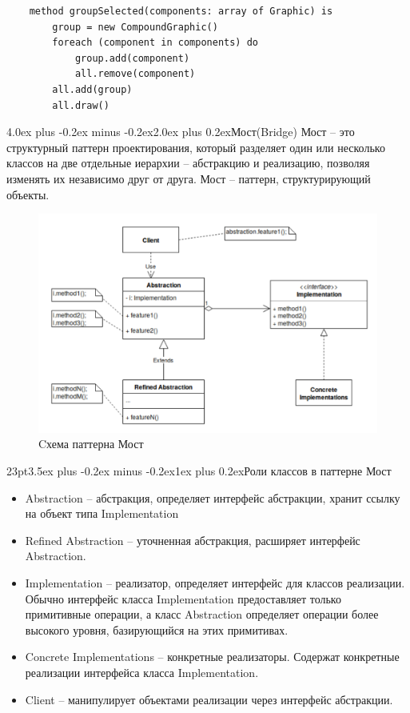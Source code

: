 \documentclass[12pt, a4paper]{book}%
\makeatletter
\renewcommand{\section}{\@startsection{section}{1}{1pt}%
{4.0ex plus -0.2ex minus -0.2ex}{2.0ex plus 0.2ex}{\centering\bf}}%
\renewcommand{\subsection}{\@startsection{subsection}{2}%
{23pt}{3.5ex plus -0.2ex minus -0.2ex}{1ex plus 0.2ex}{\bf}}%
\makeatother
\begin{document}
{\begin{lstlisting}
    method groupSelected(components: array of Graphic) is
        group = new CompoundGraphic()
        foreach (component in components) do
            group.add(component)
            all.remove(component)
        all.add(group)
        all.draw()
\end{lstlisting}

\section{Мост(Bridge)}
Мост – это структурный паттерн проектирования, который разделяет один
или несколько классов на две отдельные иерархии – абстракцию и
реализацию, позволяя изменять их независимо друг от друга.
Мост – паттерн, структурирующий объекты.
\begin{figure}[!ht]
\begin{center}
\includegraphics[scale=0.7]{images/pic/pic27-4.png}\caption{Cхема паттерна Мост}\label{figure1}
\end{center}
\end{figure}

\subsection{Роли классов в паттерне Мост}
\begin{itemize}
    \item Abstraction – абстракция, определяет интерфейс абстракции, хранит ссылку на объект типа Implementation
    \item Refined Abstraction – уточненная абстракция, расширяет интерфейс Abstraction.
    \item Implementation – реализатор, определяет интерфейс для классов реализации. Обычно интерфейс класса Implementation предоставляет только примитивные операции, а класс Abstraction определяет операции более высокого уровня, базирующийся на этих примитивах.
    \item Concrete Implementations – конкретные реализаторы. Содержат конкретные реализации интерфейса класса Implementation.
    \item Client – манипулирует объектами реализации через интерфейс абстракции.
\end{itemize}
}
\end{document}
